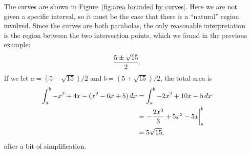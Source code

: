 \begin{solution}
The curves are shown in Figure~\ref{fig:area bounded by curves}. Here
we are not given a specific interval, so it must be the case that
there is a ``natural'' region involved. Since the curves are both
parabolas, the only reasonable interpretation is the region between
the two intersection points, which we found in the previous example:
$${5\pm\sqrt{15}\over2}.$$
If we let $a=(5-\sqrt{15})/2$ and $b=(5+\sqrt{15})/2$,
the total area is 
\begin{align*}
  \int_a^b -x^2+4x-(x^2-6x+5)\, d x
  &=\int_a^b -2x^2+10x-5\, d x \\
  &=\left.-{2x^3\over3}+5x^2-5x\right|_a^b \\
  &=5\sqrt{15},
\end{align*}
after a bit of simplification.
\end{solution}



